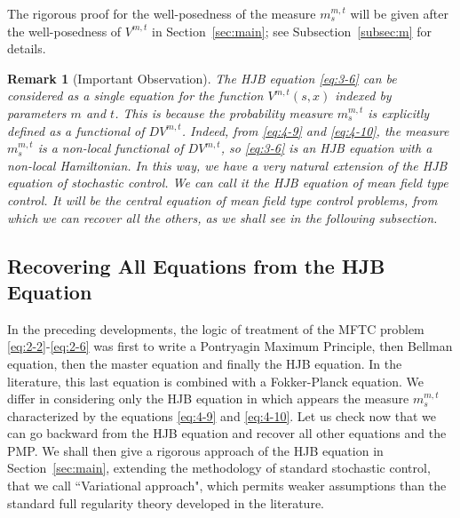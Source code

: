 \documentclass[11pt]{article}
\numberwithin{equation}{section}
\newtheorem{remark}{Remark}[section]
\newcommand{\1}{\mbox{1\hspace{-1mm}I}}
\begin{document}
The rigorous proof for the well-posedness of the measure $m^{m,t}_s$ will be given after the well-posedness of $V^{m,t}$ in Section~\ref{sec:main}; see Subsection~\ref{subsec:m} for details. 

\begin{remark}[Important Observation]
    The HJB equation \eqref{eq:3-6} can be considered as a single equation for the function $V^{m,t}(s,x)$ indexed by parameters $m$ and $t$. This is because the probability measure $m^{m,t}_s$ is explicitly defined as a functional of $DV^{m,t}$. Indeed, from \eqref{eq:4-9} and \eqref{eq:4-10}, the measure $m^{m,t}_s$ is a non-local functional of $DV^{m,t}$, so \eqref{eq:3-6} is an HJB equation with a non-local Hamiltonian. In this way, we have a very natural extension of the HJB equation of stochastic control. We can call it the HJB equation of mean field type control. It will be the central equation of mean field type control problems, from which we can recover all the others, as we shall see in the following subsection. 
\end{remark}

\subsection{Recovering All Equations from the HJB Equation} \label{subsec:RECOVERING-ALL-EQUATIONS}

In the preceding developments, the logic of treatment of the MFTC problem \eqref{eq:2-2}-\eqref{eq:2-6} was first to write a Pontryagin Maximum Principle, then Bellman equation, then the master equation and finally the HJB equation. In the literature, this last equation is combined with a Fokker-Planck equation. We differ in considering only the HJB equation in which appears the measure $m^{m,t}_s$ characterized by the equations \eqref{eq:4-9} and \eqref{eq:4-10}. Let us check now that we can go backward from the HJB equation and recover all other equations and the PMP. We shall then give a rigorous approach of the HJB equation in Section~\ref{sec:main}, extending the methodology of standard stochastic control, that we call ``Variational approach", which permits weaker assumptions than the standard full regularity theory developed in the literature. %
\end{document}
